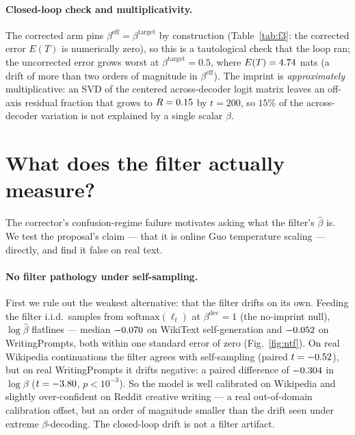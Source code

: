 \documentclass[11pt]{article}
\newcommand{\tabdir}{../results/tables}
\begin{document}
\paragraph{Closed-loop check and multiplicativity.} The corrected arm pins
$\beta^{\mathrm{eff}}=\beta^{\mathrm{target}}$ by construction
(Table~\ref{tab:f3}: the corrected error $E(T)$ is numerically zero), so this is
a tautological check that the loop ran; the uncorrected error grows worst at
$\beta^{\mathrm{target}}=0.5$, where $E(T)=4.74$ nats (a drift of
more than two orders of magnitude in $\beta^{\mathrm{eff}}$). The imprint is
\emph{approximately} multiplicative: an SVD of the centered across-decoder logit
matrix leaves an off-axis residual fraction that grows to $R=0.15$ by
$t=200$, so $15\%$ of the across-decoder variation is not explained by a single
scalar $\beta$.

\begin{table}[h]
\centering
\caption{Closed-loop error $E(T)=\mathrm{median}\,|\log\beta^{\mathrm{eff}}-\log\beta^{\mathrm{target}}|$
at $t=200$ (F3).}
\label{tab:f3}

\end{table}

\section{What does the filter actually measure?}\label{sec:measure}
The corrector's confusion-regime failure motivates asking what the filter's
$\hat\beta$ is. We test the proposal's claim --- that it is online Guo
temperature scaling --- directly, and find it false on real text.

\paragraph{No filter pathology under self-sampling.}
First we rule out the weakest alternative: that the filter drifts on its own.
Feeding the filter i.i.d.\ samples from $\mathrm{softmax}(\ell_t)$ at
$\beta^{\mathrm{dec}}=1$ (the no-imprint null), $\log\hat\beta$ flatlines ---
median $-0.070$ on WikiText self-generation and
$-0.052$ on WritingPrompts, both within one standard error of
zero (Fig.~\ref{fig:ntf}). On real Wikipedia continuations the filter agrees
with self-sampling (paired $t=-0.52$), but on real WritingPrompts it
drifts negative: a paired difference of $-0.304$ in $\log\beta$
($t=-3.80$, $p<10^{-3}$). So the model is well calibrated on Wikipedia
and slightly over-confident on Reddit creative writing --- a real out-of-domain
calibration offset, but an order of magnitude smaller than the drift seen under
extreme $\beta$-decoding. The closed-loop drift is not a filter artifact.
\end{document}
